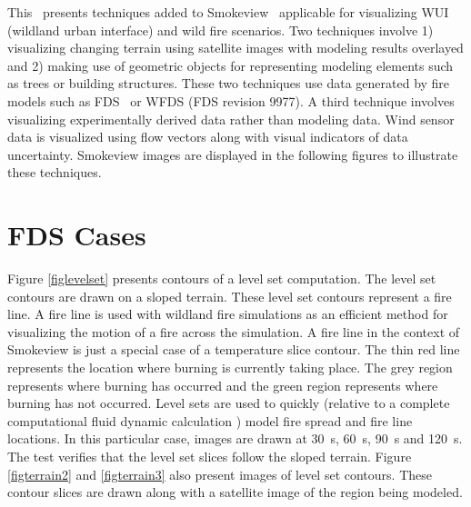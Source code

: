 This \chap\ presents techniques added to Smokeview~\cite{Smokeview_Tech_Guide} applicable for visualizing WUI (wildland urban interface) and wild fire scenarios.  Two techniques involve 1) visualizing changing terrain using satellite images with modeling results overlayed and 2) making use of geometric objects for representing modeling elements such as trees or building structures. These two techniques use data generated by fire models such as FDS~\cite{FDS_Tech_Guide} or WFDS (FDS revision 9977)\cite{Mell:2009}. A third technique involves visualizing experimentally derived data rather than modeling data.  Wind sensor data is visualized using flow vectors along with visual indicators of data uncertainty. Smokeview images are displayed in the following figures to illustrate these techniques. 

\section{FDS Cases}

Figure \ref{figlevelset} presents contours of a level set computation.  The level set contours are drawn on a sloped terrain. These level set contours represent a fire line. A fire line is used with wildland fire simulations as an efficient method for visualizing the motion of a fire across the simulation. A fire line in the context of Smokeview is just a special case of a temperature slice contour.  The thin red line represents the location where burning is currently taking place.  The grey region represents where burning has occurred and the green region represents where burning has not occurred. Level sets are used to quickly (relative to a complete computational fluid dynamic calculation ) model fire spread and fire line locations. In this particular case, images are drawn at \SI{30}{s}, \SI{60}{s}, \SI{90}{s} and \SI{120}{s}. The test verifies that the level set slices follow the sloped terrain. Figure \ref{figterrain2} and \ref{figterrain3} also present images of level set contours.  These contour slices are drawn along with a satellite image of the region being modeled.


